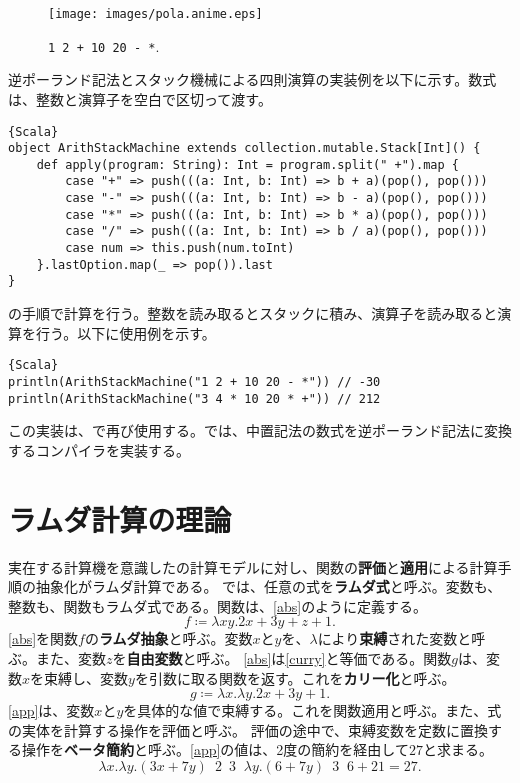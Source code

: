\documentclass[10pt,a4paper]{book}
\DeclareMathOperator*{\app}{\enspace\xrightarrow[\beta]{}\enspace}
\begin{document}
\begin{figure}[h]
\centering
\texttt{[image: images/pola.anime.eps]}
\caption{\texttt{1 2 + 10 20 - *}.\label{fig:math}}
\end{figure}

逆ポーランド記法とスタック機械による四則演算の実装例を以下に示す。数式は、整数と演算子を空白で区切って渡す。

\begin{Verbatim}{Scala}
object ArithStackMachine extends collection.mutable.Stack[Int]() {
	def apply(program: String): Int = program.split(" +").map {
		case "+" => push(((a: Int, b: Int) => b + a)(pop(), pop()))
		case "-" => push(((a: Int, b: Int) => b - a)(pop(), pop()))
		case "*" => push(((a: Int, b: Int) => b * a)(pop(), pop()))
		case "/" => push(((a: Int, b: Int) => b / a)(pop(), pop()))
		case num => this.push(num.toInt)
	}.lastOption.map(_ => pop()).last
}
\end{Verbatim}

の手順で計算を行う。整数を読み取るとスタックに積み、演算子を読み取ると演算を行う。以下に使用例を示す。

\begin{Verbatim}{Scala}
println(ArithStackMachine("1 2 + 10 20 - *")) // -30
println(ArithStackMachine("3 4 * 10 20 * +")) // 212
\end{Verbatim}

この実装は、で再び使用する。では、中置記法の数式を逆ポーランド記法に変換するコンパイラを実装する。

\chapter{ラムダ計算の理論\label{chap:lambda}}

実在する計算機を意識したの計算モデルに対し、関数の\textbf{評価}と\textbf{適用}による計算手順の抽象化がラムダ計算である。
では、任意の式を\textbf{ラムダ式}と呼ぶ。変数も、整数も、関数もラムダ式である。関数は、\eqref{abs}のように定義する。
%
\begin{equation}
\label{eq:abs}
f \coloneqq \lambda xy.2x+3y+z+1.
\end{equation}
%
\eqref{abs}を関数$f$の\textbf{ラムダ抽象}と呼ぶ。変数$x$と$y$を、$\lambda$により\textbf{束縛}された変数と呼ぶ。また、変数$z$を\textbf{自由変数}と呼ぶ。
\eqref{abs}は\eqref{curry}と等価である。関数$g$は、変数$x$を束縛し、変数$y$を引数に取る関数を返す。これを\textbf{カリー化}と呼ぶ。
%
\begin{equation}
\label{eq:curry}
g \coloneqq \lambda x.\lambda y.2x+3y+1.
\end{equation}
%
\eqref{app}は、変数$x$と$y$を具体的な値で束縛する。これを関数適用と呼ぶ。また、式の実体を計算する操作を評価と呼ぶ。
評価の途中で、束縛変数を定数に置換する操作を\textbf{ベータ簡約}と呼ぶ。\eqref{app}の値は、2度の簡約を経由して$27$と求まる。
%
\begin{equation}
\label{eq:app}
\lambda x.\lambda y.(3x+7y) \enspace 2 \enspace 3 \app \lambda y.(6+7y) \enspace 3 \app 6+21 = 27.
\end{equation}
\end{document}
